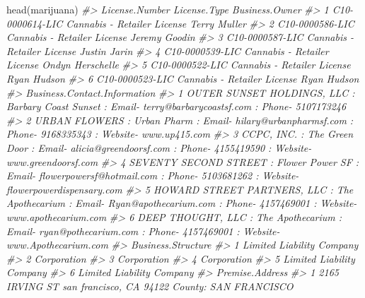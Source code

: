 \documentclass[
]{krantz}
\makeatletter
\newenvironment{Shaded}{\begin{snugshade}}{\end{snugshade}}
\newcommand{\CommentTok}[1]{\textcolor[rgb]{0.37,0.37,0.37}{\textit{#1}}}
\newcommand{\FunctionTok}[1]{\textcolor[rgb]{0,0,0}{#1}}
\newcommand{\NormalTok}[1]{#1}
\newenvironment{kframe}{%
\medskip{}
\setlength{\fboxsep}{.8em}
 \def\at@end@of@kframe{}%
 \ifinner\ifhmode%
  \def\at@end@of@kframe{\end{minipage}}%
  \begin{minipage}{\columnwidth}%
 \fi\fi%
 \def\FrameCommand##1{\hskip\@totalleftmargin \hskip-\fboxsep
 \colorbox{shadecolor}{##1}\hskip-\fboxsep
     \hskip-\linewidth \hskip-\@totalleftmargin \hskip\columnwidth}%
 \MakeFramed {\advance\hsize-\width
   \@totalleftmargin\z@ \linewidth\hsize
   \@setminipage}}%
 {\par\unskip\endMakeFramed%
 \at@end@of@kframe}
\renewenvironment{Shaded}{\begin{kframe}}{\end{kframe}}
\makeatother
\begin{document}
\begin{Shaded}
\begin{Highlighting}[]
\FunctionTok{head}\NormalTok{(marijuana)}
\CommentTok{\#\textgreater{}    License.Number                License.Type   Business.Owner}
\CommentTok{\#\textgreater{} 1 C10{-}0000614{-}LIC Cannabis {-} Retailer License     Terry Muller}
\CommentTok{\#\textgreater{} 2 C10{-}0000586{-}LIC Cannabis {-} Retailer License    Jeremy Goodin}
\CommentTok{\#\textgreater{} 3 C10{-}0000587{-}LIC Cannabis {-} Retailer License     Justin Jarin}
\CommentTok{\#\textgreater{} 4 C10{-}0000539{-}LIC Cannabis {-} Retailer License Ondyn Herschelle}
\CommentTok{\#\textgreater{} 5 C10{-}0000522{-}LIC Cannabis {-} Retailer License      Ryan Hudson}
\CommentTok{\#\textgreater{} 6 C10{-}0000523{-}LIC Cannabis {-} Retailer License      Ryan Hudson}
\CommentTok{\#\textgreater{}                                                                                                           Business.Contact.Information}
\CommentTok{\#\textgreater{} 1                             OUTER SUNSET HOLDINGS, LLC  : Barbary Coast Sunset : Email{-} terry@barbarycoastsf.com : Phone{-} 5107173246}
\CommentTok{\#\textgreater{} 2                           URBAN FLOWERS  : Urban Pharm : Email{-} hilary@urbanpharmsf.com : Phone{-} 9168335343 : Website{-} www.up415.com}
\CommentTok{\#\textgreater{} 3                      CCPC, INC.  : The Green Door : Email{-} alicia@greendoorsf.com : Phone{-} 4155419590 : Website{-} www.greendoorsf.com}
\CommentTok{\#\textgreater{} 4 SEVENTY SECOND STREET  : Flower Power SF : Email{-} flowerpowersf@hotmail.com : Phone{-} 5103681262 : Website{-} flowerpowerdispensary.com}
\CommentTok{\#\textgreater{} 5   HOWARD STREET PARTNERS, LLC  : The Apothecarium : Email{-} Ryan@apothecarium.com : Phone{-} 4157469001 : Website{-} www.apothecarium.com}
\CommentTok{\#\textgreater{} 6              DEEP THOUGHT, LLC  : The Apothecarium : Email{-} ryan@pothecarium.com : Phone{-} 4157469001 : Website{-} www.Apothecarium.com}
\CommentTok{\#\textgreater{}          Business.Structure}
\CommentTok{\#\textgreater{} 1 Limited Liability Company}
\CommentTok{\#\textgreater{} 2               Corporation}
\CommentTok{\#\textgreater{} 3               Corporation}
\CommentTok{\#\textgreater{} 4               Corporation}
\CommentTok{\#\textgreater{} 5 Limited Liability Company}
\CommentTok{\#\textgreater{} 6 Limited Liability Company}
\CommentTok{\#\textgreater{}                                                 Premise.Address}
\CommentTok{\#\textgreater{} 1  2165 IRVING ST san francisco, CA 94122 County: SAN FRANCISCO}

\end{Highlighting}
\end{Shaded}
\end{document}
